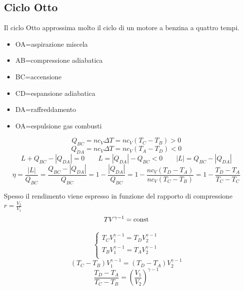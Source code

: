 \subsection{Ciclo Otto}
Il ciclo Otto approssima molto il ciclo di un motore a benzina a quattro tempi.
\begin{itemize}
\item[] OA=aspirazione miscela
\item[] AB=compressione adiabatica
\item[] BC=accensione
\item[] CD=espansione adiabatica
\item[] DA=raffreddamento
\item[] OA=espulsione gas combusti
\end{itemize}

\begin{equation*}Q_{BC}=nc_V\Delta T=nc_V(T_C-T_B)>0\end{equation*}
\begin{equation*}Q_{DA}=nc_V\Delta T=nc_V(T_A-T_D)<0\end{equation*}
\begin{equation*}L+Q_{BC}-|Q_{DA}|=0 \qquad L=|Q_{DA}|-Q_{BC}<0\qquad |L|=Q_{BC}-|Q_{DA}|\end{equation*}
\begin{equation*}\eta=\frac{|L|}{Q_{BC}}=\frac{Q_{BC}-|Q_{DA}|}{Q_{BC}}=1-\frac{|Q_{DA}|}{Q_{BC}}=1-\frac{nc_V(T_D-T_A)}{nc_V(T_C-T_B)}=1-\frac{T_D-T_A}{T_C-T_C}\end{equation*}

Spesso il rendimento viene espresso in funzione del rapporto di compressione $r=\frac{V_2}{V_1}$
\begin{equation*}TV^{\gamma-1}=\text{const}\end{equation*}

\begin{equation*}\left\{
\begin{array}{l}
T_CV_1^{\gamma-1}=T_DV_2^{\gamma-1}\\
T_BV_1^{\gamma-1}=T_AV_2^{\gamma-1}\\
\end{array}\right.\end{equation*}
\begin{equation*}(T_C-T_B)V_1^{\gamma-1}=(T_D-T_A)V_2^{\gamma-1}\end{equation*}
\begin{equation*}\frac{T_D-T_A}{T_C-T_B}=\left(\frac{V_1}{V_2}\right)^{\gamma-1}\end{equation*}

